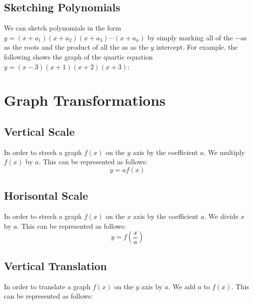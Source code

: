 \documentclass{article}
\begin{document}
\subsection{Sketching Polynomials}
We can sketch polynomials in the form $y=(x + a_1)(x + a_2)(x+a_3)\cdots(x+a_n)$ by simply marking all of the $-a$s
as the roots and the product of all the $a$s as the $y$ intercept. For example, the following shows the graph
of the quartic equation $y=(x-3)(x+1)(x+2)(x+3)$:
\begin{center}
\end{center}

\section{Graph Transformations}
\subsection{Vertical Scale}
In order to strech a graph $f(x)$ on the $y$ axis by the coefficient $a$. We multiply $f(x)$ by $a$.
This can be represented as follows:
\begin{equation}
	y = af(x)
\end{equation}

\subsection{Horisontal Scale}
In order to strech a graph $f(x)$ on the $x$ axis by the coefficient $a$. We divide $x$ by $a$.
This can be represented as follows:
\begin{equation}
	y = f\left(\frac{x}{a}\right)
\end{equation}
\subsection{Vertical Translation}
In order to translate a graph $f(x)$ on the $y$ axis by $a$. We add $a$ to $f(x)$. This can be
represented as follows:
\end{document}
